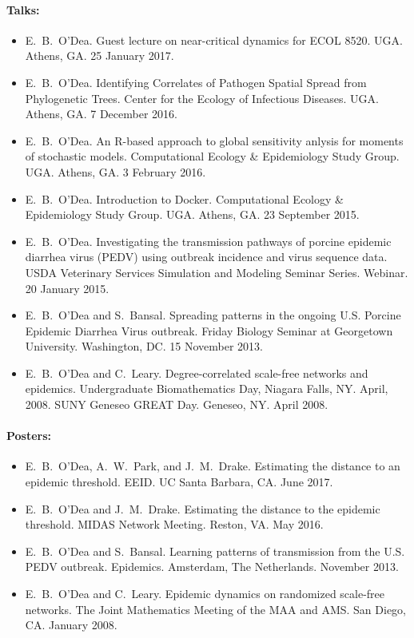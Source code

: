 \documentclass[a4paper]{article}
\begin{document}
\paragraph{Talks:} 
\begin{itemize}
\item[~] E.\ B.\ O'Dea. Guest lecture on near-critical dynamics for ECOL 8520. UGA. Athens, GA. 25 January 2017.
\item[~] E.\ B.\ O'Dea. Identifying Correlates of Pathogen Spatial
  Spread from Phylogenetic Trees. Center for the Ecology of Infectious
  Diseases. UGA. Athens, GA. 7 December 2016.
\item[~] E.\ B.\ O'Dea. An R-based approach to global sensitivity
  anlysis for moments of stochastic models. Computational Ecology
  \& Epidemiology Study Group. UGA. Athens, GA. 3 February 2016.
\item[~] E.\ B.\ O'Dea. Introduction to Docker. Computational Ecology
  \& Epidemiology Study Group. UGA. Athens, GA. 23 September 2015.
\item[~] E.\ B.\ O'Dea. Investigating the transmission pathways of
  porcine epidemic diarrhea virus (PEDV) using outbreak incidence and
  virus sequence data. USDA Veterinary Services Simulation and
  Modeling Seminar Series. Webinar. 20 January 2015.
\item[~] E.\ B.\ O'Dea and S.\ Bansal. Spreading patterns in the
  ongoing U.S. Porcine Epidemic Diarrhea Virus outbreak. Friday
  Biology Seminar at Georgetown University. Washington, DC. 15
  November 2013.
\item[~] E.\ B.\ O'Dea and C.\ Leary. Degree-correlated scale-free
  networks and epidemics.  Undergraduate Biomathematics Day, Niagara
  Falls, NY. April, 2008. SUNY Geneseo GREAT Day. Geneseo, NY. April
  2008.
\end{itemize}

\paragraph{Posters:}
\begin{itemize}
  \item[~] E.\ B.\ O'Dea, A.\ W.\ Park, and J.\ M.\ Drake. Estimating the distance to
    an epidemic threshold. EEID. UC Santa Barbara, CA. June  2017.
  \item[~] E.\ B.\ O'Dea and J.\ M.\ Drake. Estimating the distance to
    the epidemic threshold. MIDAS Network Meeting.  Reston,
    VA. May 2016.
  \item[~] E.\ B.\ O'Dea and S.\ Bansal. Learning patterns of
    transmission from the U.S. PEDV outbreak. Epidemics.
    Amsterdam, The Netherlands. November 2013.
  \item[~] E.\ B.\ O'Dea and C.\ Leary. Epidemic dynamics on
    randomized scale-free networks.  The Joint Mathematics Meeting
    of the MAA and AMS. San Diego, CA. January 2008.
\end{itemize}
\end{document}
